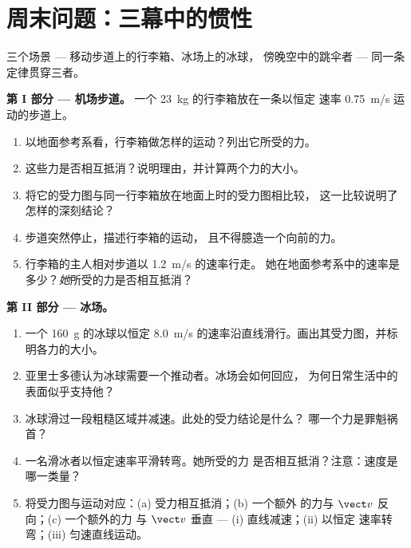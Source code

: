 \section{周末问题：三幕中的惯性}

\begin{problem}
\label{pb:g10:inertia:1}
三个场景 --- 移动步道上的行李箱、冰场上的冰球，
傍晚空中的跳伞者 --- 同一条定律贯穿三者。

\medskip
\noindent\textbf{第 I 部分 --- 机场步道。}
一个 \qty{23}{kg} 的行李箱放在一条以恒定
速率 \qty{0.75}{m/s} 运动的步道上。
\begin{enumerate}
  \item 以地面参考系看，行李箱做怎样的运动？列出它所受的力。
  \item 这些力是否相互抵消？说明理由，并计算两个力的大小。
  \item 将它的受力图与同一行李箱放在地面上时的受力图相比较，
        这一比较说明了怎样的深刻结论？
  \item 步道突然停止，描述行李箱的运动，
        且不得臆造一个向前的力。
  \item 行李箱的主人相对步道以 \qty{1.2}{m/s} 的速率行走。
        她在地面参考系中的速率是多少？\emph{她}所受的力是否相互抵消？
\end{enumerate}

\medskip
\noindent\textbf{第 II 部分 --- 冰场。}
\begin{enumerate}[resume]
  \item 一个 \qty{160}{g} 的冰球以恒定
        \qty{8.0}{m/s} 的速率沿直线滑行。画出其受力图，并标明各力的大小。
  \item 亚里士多德认为冰球需要一个推动者。冰场会如何回应，
        为何日常生活中的表面似乎支持他？
  \item 冰球滑过一段粗糙区域并减速。此处的受力结论是什么？
        哪一个力是罪魁祸首？
  \item 一名滑冰者以恒定速率平滑转弯。她所受的力
        是否相互抵消？注意：速度是哪一类量？
  \item 将受力图与运动对应：(a) 受力相互抵消；(b) 一个额外
        的力与 $\vect v$ 反向；(c) 一个额外的力
        与 $\vect v$ 垂直 --- (i) 直线减速；(ii) 以恒定
        速率转弯；(iii) 匀速直线运动。
\end{enumerate}


\end{problem}
